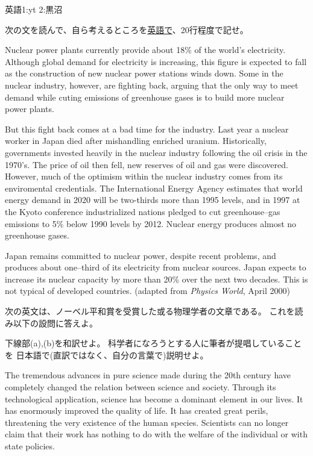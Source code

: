\documentclass[fleqn]{jbook}
\begin{document}
\begin{question}{英語}{1:yt 2:黒沼}
\begin{subquestions}
\SubQuestion
    次の文を読んで、自ら考えるところを\underline{英語で}、20行程度で記せ。
\baselineskip=12pt

Nuclear power plants currently provide about 18\% of the world's electricity.
Although global demand for electricity is increasing,
this figure is expected to fall as the construction of new nuclear power
stations winds down.
Some in the nuclear industry, however, are fighting back, arguing that
the only way to meet demand while cuting emissions of greenhouse gases
is to build more nuclear power plants.


But this fight back comes at a bad time for the industry.
Last year a nuclear worker in Japan died after mishandling enriched uranium.
Historically, governments invested heavily in the nuclear industry following
the oil crisis in the 1970's.
The price of oil then fell, new reserves of oil and gas were discovered.
However, much of the optimism within the nuclear industry comes from
its enviromental credentials.
The International Energy Agency estimates that world energy demand in 2020
will be two-thirds more than 1995 levels, and in 1997 at the Kyoto conference
industrialized nations pledged to cut greenhouse--gas emissions to
5\% below 1990 levels by 2012.
Nuclear energy produces almost no greenhouse gases.


Japan remains committed to nuclear power, despite recent problems,
and produces about one--third of its electricity from nuclear sources.
Japan expects to increase its nuclear capacity
by more than 20\% over the next two decades.
This is not typical of developed countries.
\hfil (adapted from \textit{Physics World}, April 2000)


\SubQuestion
次の英文は、ノーベル平和賞を受賞した或る物理学者の文章である。
これを読み以下の設問に答えよ。

\begin{subsubquestions}
  \SubSubQuestion 下線部(a),(b)を和訳せよ。
  \SubSubQuestion 科学者になろうとする人に筆者が提唱していることを
	日本語で(直訳ではなく、自分の言葉で)説明せよ。
\end{subsubquestions}

\baselineskip=12pt

The tremendous advances in pure science made during
the 20th century have completely changed the relation
between science and society. Through its technological
application, science has become a dominant element in
our lives. It has enormously improved the quality of life.
It has created great perils, threatening the very existence 
of the human species. Scientists can no longer claim that
their work has nothing to do with the welfare of the individual
or with state policies.


\end{subquestions}
\end{question}
\end{document}
